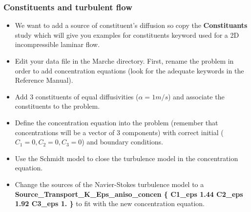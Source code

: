 \documentclass[10pt, hyperref={unicode=true,pdfusetitle, bookmarks=true,bookmarksnumbered=false,bookmarksopen=false, breaklinks=false,pdfborder={0 0 1},backref=true,colorlinks=true,linkcolor=darkblue,pageanchor}]{beamer}
\begin{document}
\begin{frame}
\frametitle{Constituents and turbulent flow}
\begin{block}{}

\begin{itemize}
\item We want to add a source of constituent's diffusion so copy the \textbf{Constituants} study which will give you examples for constituents keyword used for a 2D incompressible laminar flow.

\item Edit your data file in the Marche directory. First, rename the problem in order to add concentration equations (look for the adequate keywords in the Reference Manual).

\item Add 3 constituents of equal diffusivities ($\alpha=1m/s$) and associate the constituents to the problem.

\item Define the concentration equation into the problem (remember that concentrations will be a vector of 3 components) with correct initial ($C_1=0, C_2=0, C_3=0$) and boundary conditions.

\item Use the Schmidt model to close the turbulence model in the concentration equation.

\item Change the sources of the Navier-Stokes turbulence model to a \textbf{Source\_Transport\_K\_Eps\_aniso\_concen \{ C1\_eps 1.44 C2\_eps 1.92 C3\_eps 1. \} } to fit with the new concentration equation.
\end{itemize}

\end{block}
\end{frame}
\end{document}
